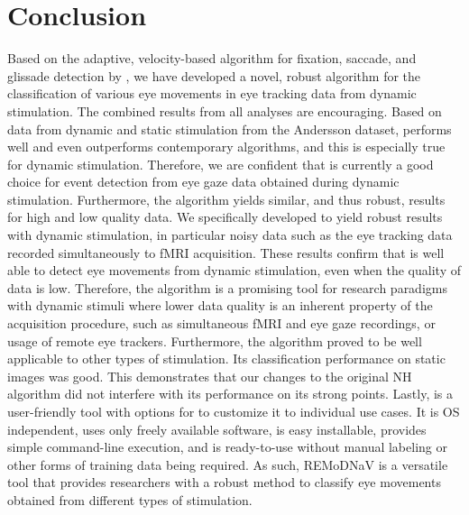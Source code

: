 

\section*{Conclusion}\label{con}

Based on the adaptive, velocity-based algorithm for fixation, saccade, and
glissade detection by \cite{Nystrom2010AnData}, we have developed a novel,
robust algorithm for the classification of various eye movements in eye
tracking data from dynamic stimulation.  The combined results from all analyses
are encouraging. Based on data from dynamic and static stimulation from the
Andersson dataset, \remodnav performs well and even outperforms contemporary
algorithms, and this is especially true for dynamic stimulation. Therefore, we
are confident that \remodnav is currently a good choice for event detection
from eye gaze data obtained during dynamic stimulation.  Furthermore, the
algorithm yields similar, and thus robust, results for high and low quality
data. We specifically developed \remodnav to yield robust results with dynamic
stimulation, in particular noisy data such as the eye tracking data recorded
simultaneously to fMRI acquisition. These results confirm that \remodnav is
well able to detect eye movements from dynamic stimulation, even when the
quality of data is low. Therefore, the algorithm is a promising tool for
research paradigms with dynamic stimuli where lower data quality is an inherent
property of the acquisition procedure, such as simultaneous fMRI and eye gaze
recordings, or usage of remote eye trackers.  Furthermore, the algorithm proved
to be well applicable to other types of stimulation. Its classification
performance on static images was good. This demonstrates that our changes to
the original NH algorithm did not interfere with its performance on its strong
points. Lastly, \remodnav is a user-friendly tool with options for to customize
it to individual use cases. It is OS independent, uses only freely available
software, is easy installable, provides simple command-line execution, and is
ready-to-use without manual labeling or other forms of training data being
required. As such, REMoDNaV is a versatile tool that provides researchers with
a robust method to classify eye movements obtained from different types of
stimulation.

